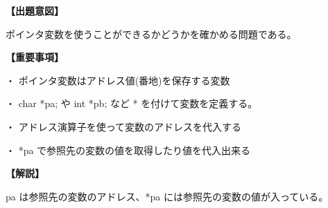 \noindent \textbf{【出題意図】}

\noindent ポインタ変数を使うことができるかどうかを確かめる問題である。

\vspace{1em}
\noindent \textbf{【重要事項】}

\medskip
\noindent ・ ポインタ変数はアドレス値(番地)を保存する変数 

\medskip
\noindent ・ char *pa; や int *pb; など * を付けて変数を定義する。

\medskip
\noindent ・ アドレス演算子を使って変数のアドレスを代入する

\medskip
\noindent ・ *pa で参照先の変数の値を取得したり値を代入出来る

\vspace{1em}
\noindent \textbf{【解説】}

\noindent pa は参照先の変数のアドレス、*pa には参照先の変数の値が入っている。

